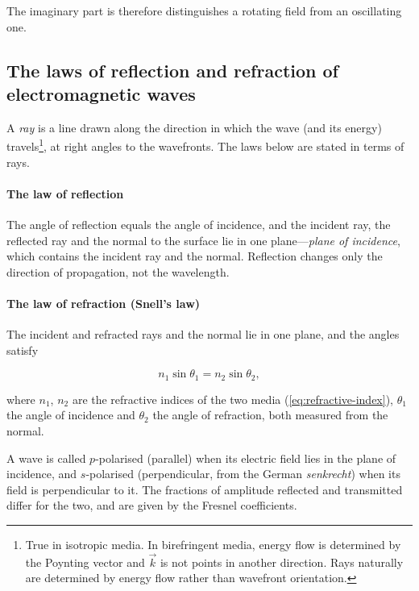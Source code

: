         The imaginary part is therefore distinguishes a rotating field from an oscillating one.

    \subsection{The laws of reflection and refraction of electromagnetic waves}

        A \emph{ray} is a line drawn along the direction in which the wave (and its energy) travels\footnote{
            True in isotropic media. In birefringent media, energy flow is determined by the Poynting vector and $\vec{k}$ is not points in another direction. Rays naturally are determined by energy flow rather than wavefront orientation.
        }, at right angles to the wavefronts. The laws below are stated in terms of rays.

        \paragraph{The law of reflection}

        The angle of reflection equals the angle of incidence, and the incident ray, the reflected ray and the normal to the surface lie in one plane---\emph{plane of incidence}, which contains the incident ray and the normal. Reflection changes only the direction of propagation, not the wavelength.

        \paragraph{The law of refraction (Snell's law)}

        The incident and refracted rays and the normal lie in one plane, and the angles satisfy

        \begin{equation}\label{eq:snell}
            n_1 \sin \theta_1 = n_2 \sin \theta_2,
        \end{equation}

        where $n_1$, $n_2$ are the refractive indices of the two media (\cref{eq:refractive-index}), $\theta_1$ the angle of incidence and $\theta_2$ the angle of refraction, both measured from the normal.

        A wave is called $p$-polarised (parallel) when its electric field lies in the plane of incidence, and $s$-polarised (perpendicular, from the German \emph{senkrecht}) when its field is perpendicular to it. The fractions of amplitude reflected and transmitted differ for the two, and are given by the Fresnel coefficients.

